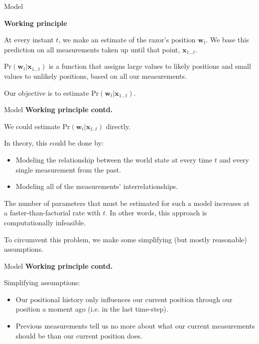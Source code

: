 \documentclass[10pt]{beamer}
\begin{document}
\begin{frame}{Model}
	
	\textbf{Working principle}
	
	At every instant $t$, we make an estimate of the razor's position $\mathbf{w}_t$. We base this prediction on all measurements taken up until that point, $\mathbf{x}_{1...t}$.
	 
	 $\text{Pr}(\mathbf{w}_t | \mathbf{x}_{1...t})$ is a function that assigns large values to likely positions and small values to unlikely positions, based on all our measurements. 
	 
	 Our objective is to estimate $\text{Pr}(\mathbf{w}_t|\mathbf{x}_{1...t})$. 
	 
\end{frame}

\begin{frame}{Model}
	\textbf{Working principle contd.}
	
	We could estimate $\text{Pr}(\mathbf{w}_t|\mathbf{x}_{1..t})$ directly.
	
	 In theory, this could be done by:
	 \begin{itemize}
	 	\item Modeling the relationship between the world state at every time $t$ and every single measurement from the past.
	 	\item Modeling all of the measurements' interrelationships.
	 \end{itemize}
	The number of parameters that must be estimated for such a model increases at a faster-than-factorial rate with $t$. In other words, this approach is computationally infeasible.
	
	 To circumvent this problem, we make some simplifying (but mostly reasonable) assumptions.

\end{frame}

\begin{frame}{Model}
	\textbf{Working principle contd.}
	
	Simplifying assumptions:
	\begin{itemize}
		\item Our positional history only influences our current position through our position a moment ago (i.e. in the last time-step).
		\item Previous measurements tell us no more about what our current measurements should be than our current position does.
	\end{itemize}

\end{frame}
\end{document}
